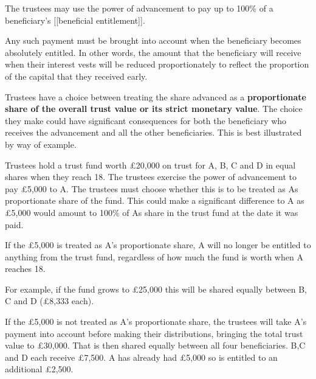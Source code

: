 \documentclass[
]{article}
\newenvironment{Shaded}{}{}
\newcommand{\NormalTok}[1]{#1}
\begin{document}
The trustees may use the power of advancement to pay up to 100\% of a
beneficiary's {[}{[}beneficial entitlement{]}{]}.

Any such payment must be brought into account when the beneficiary
becomes absolutely entitled. In other words, the amount that the
beneficiary will receive when their interest vests will be reduced
proportionately to reflect the proportion of the capital that they
received early.

Trustees have a choice between treating the share advanced as a
\textbf{proportionate share of the overall trust value or its strict
monetary value}. The choice they make could have significant
consequences for both the beneficiary who receives the advancement and
all the other beneficiaries. This is best illustrated by way of example.

\begin{Shaded}
\begin{Highlighting}[]
\NormalTok{Trustees hold a trust fund worth £20,000 on trust for A, B, C and D in equal shares when they reach 18. The trustees exercise the power of advancement to pay £5,000 to A. The trustees must choose whether this is to be treated as A\textquotesingle{}s proportionate share of the fund. This could make a significant difference to A as £5,000 would amount to 100\% of A\textquotesingle{}s share in the trust fund at the date it was paid.}

\NormalTok{If the £5,000 is treated as A’s proportionate share, A will no longer be entitled to anything from the trust fund, regardless of how much the fund is worth when A reaches 18.}

\NormalTok{For example, if the fund grows to £25,000 this will be shared equally between B, C and D (£8,333 each).}

\NormalTok{If the £5,000 is not treated as A’s proportionate share, the trustees will take A’s payment into account before making their distributions, bringing the total trust value to £30,000. That is then shared equally between all four beneficiaries. B,C and D each receive £7,500. A has already had £5,000 so is entitled to an additional £2,500.}
\end{Highlighting}
\end{Shaded}
\end{document}
